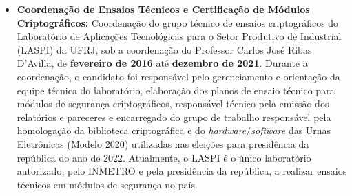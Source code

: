\begin{itemize}

\item \textbf{Coordenação de Ensaios Técnicos e Certificação de Módulos Criptográficos:}
Coordenação do grupo técnico de ensaios criptográficos do Laboratório de Aplicações Tecnológicas para o Setor Produtivo de Industrial (LASPI) da UFRJ, sob a coordenação do Professor Carlos José Ribas D'Avilla, de \textbf{fevereiro de 2016} até \textbf{dezembro de 2021}. Durante a coordenação, o candidato foi responsável pelo gerenciamento e orientação da equipe técnica do laboratório, elaboração dos planos de ensaio técnico para módulos de segurança criptográficos, responsável técnico pela emissão dos relatórios e pareceres e encarregado do grupo de trabalho responsável pela homologação da biblioteca criptográfica e do \textit{hardware}/\textit{software} das Urnas Eletrônicas (Modelo 2020) utilizadas nas eleições para presidência da república do ano de 2022. Atualmente, o LASPI é o único laboratório autorizado, pelo INMETRO e pela presidência da república, a realizar ensaios técnicos em módulos de segurança no país.

\end{itemize}

